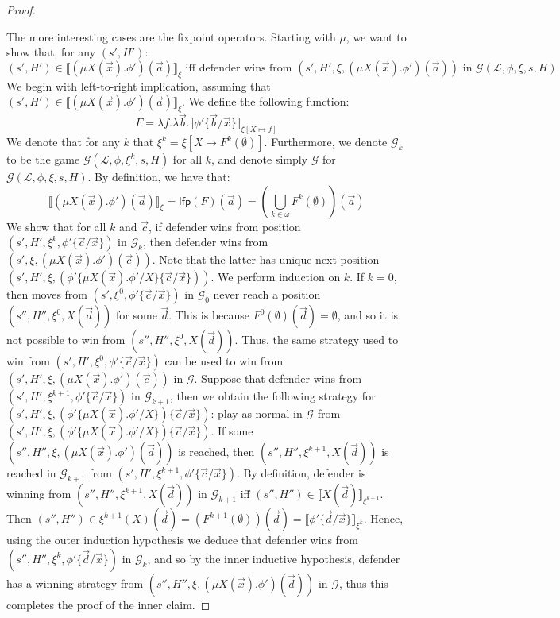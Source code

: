\documentclass[10pt,a4paper]{article}
\theoremstyle{definition}
\theoremstyle{remark}
\newcommand\sem[2][\xi]{\llbracket#2\rrbracket_{#1}}
\newcommand\Gcal{\mathcal{G}}
\newcommand\Lcal{\mathcal{L}}
\newcommand\lfp{\mathsf{lfp}}
\begin{document}
\begin{proof}
\begin{itemize}
	\end{itemize}
		The more interesting cases are the fixpoint operators.
	Starting with $\mu$, we want to show that, for any $(s', H')$:
	\[
	(s', H')\in \sem{(\mu X(\vec x).\phi')(\vec a)} \text{ iff defender wins from } (s', H', \xi, (\mu X(\vec x).\phi')(\vec a)) \text{ in } \Gcal(\Lcal, \phi, \xi, s, H)
	\]
	We begin with left-to-right implication, assuming that $(s', H') \in \sem{(\mu X(\vec x).\phi')(\vec a)}$. 
	We define the following function:	\[
	F = \lambda f.\lambda \vec b.\sem[{\xi[X \mapsto f]}]{\phi'\{\vec b / \vec x\}}
	\]
	We denote that for any $k$ that $\xi^k = \xi[X \mapsto F^k(\emptyset)]$.
	Furthermore, we denote $\Gcal_{k}$ to be the game $\Gcal(\Lcal, \phi, \xi^k, s, H)$ for all $k$, and denote simply $\Gcal$ for $\Gcal(\Lcal, \phi, \xi, s, H)$.
	By definition, we have that:
	\[
	\sem{(\mu X(\vec x).\phi')(\vec a)} = \lfp(F)(\vec a) = (\bigcup_{k \in \omega} F^k(\emptyset))(\vec a)
	\]
	We show that for all $k$ and $\vec c$, if defender wins from position $(s', H', \xi^k, \phi'\{\vec c/\vec x\})$ in $\Gcal_k$,
	then defender wins from $(s', \xi, (\mu X(\vec x).\phi')(\vec c))$.
	Note that the latter has unique next position $(s', H', \xi, (\phi'\{\mu X(\vec x).\phi' / X\}\{\vec c / \vec x\}))$. 
	We perform induction on $k$. 
	If $k = 0$, then moves from $(s', \xi^0, \phi'\{\vec c / \vec x\})$ in $\Gcal_0$ never reach a position $(s'',H'', \xi^0, X(\vec d))$ for some $\vec d$. 
	This is because $F^0(\emptyset)(\vec d) = \emptyset$, and so it is not possible to win from $(s'', H'', \xi^0, X(\vec d))$.
	Thus, the same strategy used to win from $(s', H', \xi^0, \phi'\{\vec c / \vec x\})$ can be used to win from $(s', H', \xi, (\mu X(\vec x).\phi')(\vec c))$ in $\Gcal$.
	Suppose that defender wins from $(s', H', \xi^{k + 1}, \phi'\{\vec c / \vec x\})$ in $\Gcal_{k + 1}$, then we obtain the following strategy for $(s', H', \xi, (\phi'\{\mu X(\vec x).\phi' / X\})\{\vec c / \vec x\})$:
	play as normal in $\Gcal$ from $(s', H', \xi, (\phi'\{\mu X(\vec x).\phi' / X\})\{\vec c / \vec x\})$.
	If some $(s'', H'', \xi, (\mu X(\vec x).\phi')(\vec d))$ is reached, then $(s'', H'', \xi^{k + 1}, X(\vec d))$ is reached in $\Gcal_{k + 1}$ from $(s', H', \xi^{k+1}, \phi'\{\vec c / \vec x\})$. 
	By definition, defender is winning from $(s'', H'', \xi^{k + 1}, X(\vec d))$ in $\Gcal_{k+1}$ iff $(s'', H'')\in \sem[\xi^{k + 1}]{X(\vec d)}$.
	Then $(s'', H'') \in \xi^{k + 1}(X)(\vec d) = (F^{k + 1}(\emptyset))(\vec d) = \sem[\xi^k]{\phi'\{\vec d / \vec x\}}$.
	Hence, using the outer induction hypothesis we deduce that defender wins from $(s'', H'',\xi^k, \phi'\{\vec d / \vec x\})$ in $\Gcal_k$, and so by the inner inductive hypothesis, defender has a winning strategy from $(s'', H'', \xi, (\mu X(\vec x).\phi')(\vec d))$ in $\Gcal$, thus this completes the proof of the inner claim.

\end{proof}
\end{document}
